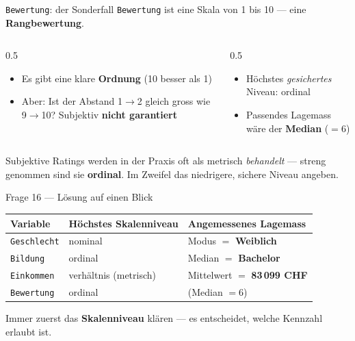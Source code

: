 \documentclass[aspectratio=169,11pt]{beamer}
\begin{document}
\begin{frame}{\texttt{Bewertung}: der Sonderfall}
\texttt{Bewertung} ist eine Skala von 1 bis 10 --- eine
\textbf{Rangbewertung}.

\vspace{0.3cm}
\begin{columns}[T]
\begin{column}{0.5\textwidth}
\begin{itemize}
  \item Es gibt eine klare \textbf{Ordnung} (10 besser als 1)
  \item Aber: Ist der Abstand 1$\to$2 gleich gross wie 9$\to$10?
        Subjektiv \textbf{nicht garantiert}
\end{itemize}
\end{column}
\begin{column}{0.5\textwidth}
\begin{itemize}
  \item Höchstes \emph{gesichertes} Niveau: \alert{ordinal}
  \item Passendes Lagemass wäre der \textbf{Median} ($=6$)
\end{itemize}
\end{column}
\end{columns}

\vspace{0.3cm}
\begin{warnung}
Subjektive Ratings werden in der Praxis oft als metrisch \emph{behandelt} ---
streng genommen sind sie \textbf{ordinal}. Im Zweifel das niedrigere,
sichere Niveau angeben.
\end{warnung}
\end{frame}

\begin{frame}{Frage 16 --- Lösung auf einen Blick}
\centering
\renewcommand{\arraystretch}{1.35}
\begin{tabular}{lll}
\toprule
Variable & Höchstes Skalenniveau & Angemessenes Lagemass \\
\midrule
\texttt{Geschlecht} & nominal & Modus $=$ \textbf{Weiblich} \\
\texttt{Bildung}    & ordinal & Median $=$ \textbf{Bachelor} \\
\texttt{Einkommen}  & verhältnis (metrisch) & Mittelwert $=$ \textbf{83\,099 CHF} \\
\texttt{Bewertung}  & ordinal & (Median $=6$) \\
\bottomrule
\end{tabular}

\vspace{0.5cm}
\begin{merke}
Immer zuerst das \textbf{Skalenniveau} klären --- es entscheidet, welche
Kennzahl erlaubt ist.
\end{merke}
\end{frame}
\end{document}
